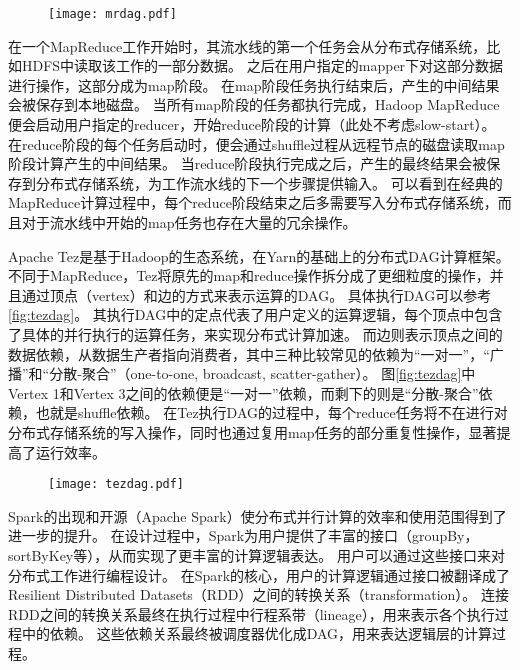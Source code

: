 \begin{figure}[!htp]
    \centering
    \texttt{[image: mrdag.pdf]}
\end{figure}

在一个MapReduce工作开始时，其流水线的第一个任务会从分布式存储系统，比如HDFS中读取该工作的一部分数据。
之后在用户指定的mapper下对这部分数据进行操作，这部分成为map阶段。
在map阶段任务执行结束后，产生的中间结果会被保存到本地磁盘。
当所有map阶段的任务都执行完成，Hadoop MapReduce便会启动用户指定的reducer，开始reduce阶段的计算（此处不考虑slow-start）。
在reduce阶段的每个任务启动时，便会通过shuffle过程从远程节点的磁盘读取map阶段计算产生的中间结果。
当reduce阶段执行完成之后，产生的最终结果会被保存到分布式存储系统，为工作流水线的下一个步骤提供输入。
可以看到在经典的MapReduce计算过程中，每个reduce阶段结束之后多需要写入分布式存储系统，而且对于流水线中开始的map任务也存在大量的冗余操作。

Apache Tez\cite{tez}是基于Hadoop的生态系统，在Yarn的基础上\cite{yarn}的分布式DAG计算框架。
不同于MapReduce，Tez将原先的map和reduce操作拆分成了更细粒度的操作，并且通过顶点（vertex）和边的方式来表示运算的DAG。
具体执行DAG可以参考\ref{fig:tezdag}。
其执行DAG中的定点代表了用户定义的运算逻辑，每个顶点中包含了具体的并行执行的运算任务，来实现分布式计算加速。
而边则表示顶点之间的数据依赖，从数据生产者指向消费者，其中三种比较常见的依赖为“一对一”，“广播”和“分散-聚合”（one-to-one, broadcast, scatter-gather）。
图\ref{fig:tezdag}中Vertex 1和Vertex 3之间的依赖便是“一对一”依赖，而剩下的则是“分散-聚合”依赖，也就是shuffle依赖。
在Tez执行DAG的过程中，每个reduce任务将不在进行对分布式存储系统的写入操作，同时也通过复用map任务的部分重复性操作，显著提高了运行效率。

\begin{figure}[!htp]
    \centering
    \texttt{[image: tezdag.pdf]}
\end{figure}

Spark\cite{spark}的出现和开源（Apache Spark\cite{apachespark}）使分布式并行计算的效率和使用范围得到了进一步的提升。
在设计过程中，Spark为用户提供了丰富的接口（groupBy，sortByKey等），从而实现了更丰富的计算逻辑表达。
用户可以通过这些接口来对分布式工作进行编程设计。
在Spark的核心，用户的计算逻辑通过接口被翻译成了Resilient Distributed Datasets（RDD）之间的转换关系（transformation）。
连接RDD之间的转换关系最终在执行过程中行程系带（lineage），用来表示各个执行过程中的依赖。
这些依赖关系最终被调度器优化成DAG，用来表达逻辑层的计算过程。

